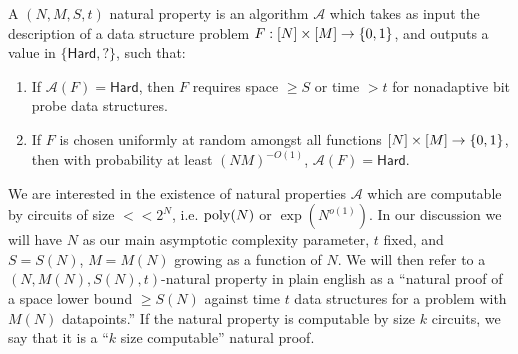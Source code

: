 \begin{definition}\label{cellprobe:def:natural-props}
A $(N,M,S,t)$ natural property is an algorithm $\mathcal{A}$ which takes as input the description of a data structure problem $F: [N] \times [M] \to \{0,1\}$, and outputs a value in $\{\mathsf{Hard}, \mathsf{?}\}$, such that:
\begin{enumerate}
    \item If $\mathcal{A}(F) = \mathsf{Hard}$, then $F$ requires space $\geq S$ or time $>t$ for nonadaptive bit probe data structures. 
    \item If $F$ is chosen uniformly at random amongst all functions $[N] \times [M] \to \{0,1\}$, then with probability at least $(NM)^{-O(1)}$, $\mathcal{A}(F) = \mathsf{Hard}$.
\end{enumerate}
\end{definition}
We are interested in the existence of natural properties $\mathcal{A}$ which are computable by circuits of size $<< 2^N$, i.e. $\mathrm{poly}(N)$ or $\exp(N^{o(1)})$. In our discussion we will have $N$ as our main asymptotic complexity parameter, $t$ fixed, and $S = S(N)$, $M = M(N)$ growing as a function of $N$. We will then refer to a $(N,M(N),S(N),t)$-natural property in plain english as a ``natural proof of a space lower bound $\geq S(N)$ against time $t$ data structures for a problem with $M(N)$ datapoints.'' 
If the natural property is computable by size $k$ circuits, we say that it is a ``$k$ size computable'' natural proof. 

